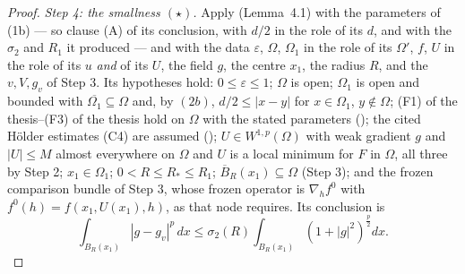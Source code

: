 \begin{proof}
\emph{Step 4: the smallness $(\star)$.}  Apply
 (Lemma~4.1) with the parameters of (1b)
--- so clause (A) of its conclusion, with $d/2$ in the role of its $d$,
and with the $\sigma_2$ and $R_1$ it produced --- and with the data
$\varepsilon$, $\Omega$, $\Omega_1$ in the role of its $\Omega'$,
$f$, $U$ in the role of its $u$ \emph{and} of its $U$, the field $g$, the
centre $x_1$, the radius $R$, and the $v,V,g_v$ of Step 3.  Its hypotheses
hold: $0\le\varepsilon\le1$; $\Omega$ is open; $\Omega_1$ is open and
bounded with $\overline{\Omega_1}\subseteq\Omega$ and, by $(2b)$,
$d/2\le|x-y|$ for $x\in\Omega_1$, $y\notin\Omega$;
(F1) of the thesis--(F3) of the thesis hold on $\Omega$ with the stated parameters
(); the cited H\"older estimates (C4) are
assumed (); $U\in W^{1,p}(\Omega)$ with
weak gradient $g$ and $|U|\le M$ almost everywhere on $\Omega$ and
$U$ is a local minimum for $F$ in $\Omega$, all three by Step 2;
$x_1\in\Omega_1$; $0<R\le R_\ast\le R_1$;
$\overline B_R(x_1)\subseteq\Omega$ (Step 3); and the frozen comparison bundle
of Step 3, whose frozen operator is $\nabla_hf^0$ with
$f^0(h)=f(x_1,U(x_1),h)$, as that node requires.  Its conclusion is
\[
\int_{B_R(x_1)}|g-g_v|^p\,dx
\le\sigma_2(R)\int_{B_R(x_1)}(1+|g|^2)^{\frac p2}dx .
\tag{$\star$}
\]


\end{proof}
